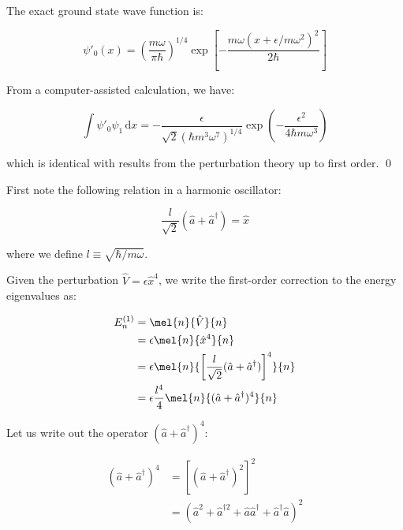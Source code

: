 \documentclass[12pt]{article}
\begin{document}
The exact ground state wave function is:

\begin{equation}
    \psi'_{0}(x) = \left( \frac{m\omega}{\pi\hbar} \right)^{1/4} \exp \left[ -\frac{m\omega (x + \epsilon/m\omega^{2})^{2}}{2\hbar} \right]
\end{equation}

From a computer-assisted calculation, we have:

\begin{equation}
    \int \psi'_{0} \psi_{1} \, \mathrm{d}x = -\frac{\epsilon}{\sqrt{2} (\hbar m^{3} \omega^{7})^{1/4}} \exp \left( -\frac{\epsilon^{2}}{4\hbar m \omega^{3}} \right)
\end{equation}

which is identical with results from the perturbation theory up to first order.
\qed


First note the following relation in a harmonic oscillator:

\begin{equation}
    \frac{l}{\sqrt{2}} (\hat{a} + \hat{a}^{\dagger}) = \hat{x}
\end{equation}

where we define $l \equiv \sqrt{\hbar/m\omega}$.

Given the perturbation $\hat{V} = \epsilon \hat{x}^{4}$, we write the first-order correction to the energy eigenvalues as:

\begin{equation}
    \begin{split}
        E_{n}^{(1)} &= \mel{n}{\hat{V}}{n} \\
        &= \epsilon \mel{n}{\hat{x}^{4}}{n} \\
        &= \epsilon \mel{n}{\left[ \frac{l}{\sqrt{2}} (\hat{a} + \hat{a}^{\dagger}) \right]^{4}}{n} \\
        &= \epsilon \frac{l^{4}}{4} \mel{n}{(\hat{a} + \hat{a}^{\dagger})^{4}}{n}
    \end{split}
\end{equation}

Let us write out the operator $(\hat{a} + \hat{a}^{\dagger})^{4}$:

\begin{equation}
    \begin{split}
        (\hat{a} + \hat{a}^{\dagger})^{4} &= \left[ (\hat{a} + \hat{a}^{\dagger})^{2} \right]^{2} \\
        &= \left( \hat{a}^{2} + \hat{a}^{\dagger 2} + \hat{a}\hat{a}^{\dagger} + \hat{a}^{\dagger}\hat{a} \right)^{2}
    \end{split}
\end{equation}
\end{document}
